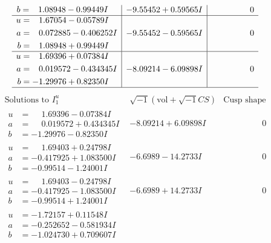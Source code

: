 \documentclass[1p]{elsarticle_modified}
\theoremstyle{definition}
\newcommand{\I}{\sqrt{-1}}
\begin{document}
$$\begin{array}{c|c|c}
\begin{aligned}
b &= \phantom{-}1.08948 - 0.99449 I\end{aligned}
 & -9.55452 + 0.59565 I & \phantom{-0.000000 } 0 \\ \hline\begin{aligned}
u &= \phantom{-}1.67054 - 0.05789 I \\
a &= \phantom{-}0.072885 - 0.406252 I \\
b &= \phantom{-}1.08948 + 0.99449 I\end{aligned}
 & -9.55452 - 0.59565 I & \phantom{-0.000000 } 0 \\ \hline\begin{aligned}
u &= \phantom{-}1.69396 + 0.07384 I \\
a &= \phantom{-}0.019572 - 0.434345 I \\
b &= -1.29976 + 0.82350 I\end{aligned}
 & -8.09214 - 6.09898 I & \phantom{-0.000000 } 0\\
 \hline 
 \end{array}$$\newpage$$\begin{array}{c|c|c}  
\text{Solutions to }I^u_{1}& \I (\text{vol} + \sqrt{-1}CS) & \text{Cusp shape}\\
 \hline 
\begin{aligned}
u &= \phantom{-}1.69396 - 0.07384 I \\
a &= \phantom{-}0.019572 + 0.434345 I \\
b &= -1.29976 - 0.82350 I\end{aligned}
 & -8.09214 + 6.09898 I & \phantom{-0.000000 } 0 \\ \hline\begin{aligned}
u &= \phantom{-}1.69403 + 0.24798 I \\
a &= -0.417925 + 1.083500 I \\
b &= -0.99514 - 1.24001 I\end{aligned}
 & -6.6989 - 14.2733 I & \phantom{-0.000000 } 0 \\ \hline\begin{aligned}
u &= \phantom{-}1.69403 - 0.24798 I \\
a &= -0.417925 - 1.083500 I \\
b &= -0.99514 + 1.24001 I\end{aligned}
 & -6.6989 + 14.2733 I & \phantom{-0.000000 } 0 \\ \hline\begin{aligned}
u &= -1.72157 + 0.11548 I \\
a &= -0.252652 - 0.581934 I \\
b &= -1.024730 + 0.709607 I\end{aligned}

\end{array}$$
\end{document}
